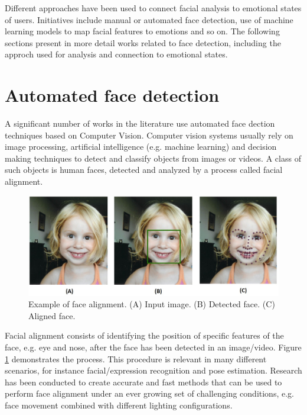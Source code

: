 Different approaches have been used to connect facial analysis to emotional states of users. Initiatives include manual or automated face detection, use of machine learning models to map facial features to emotions and so on. The following sections present in more detail works related to face detection, including the approch used for analysis and connection to emotional states.

\section{Automated face detection}

A significant number of works in the literature use automated face dection techniques based on Computer Vision. Computer vision systems usually rely on image processing, artificial intelligence (e.g. machine learning) and decision making techniques to detect and classify objects from images or videos. A class of such objects is human faces, detected and analyzed by a process called facial alignment.

\begin{figure}[h]
    \centering
    \includegraphics[width=\linewidth]{figures/face_alignment.jpg}
    \caption{Example of face alignment. (A) Input image. (B) Detected face. (C) Aligned face.}
    \label{fig:alignment}
\end{figure}

Facial alignment consists of identifying the position of specific features of the face, e.g. eye and nose, after the face has been detected in an image/video. Figure \ref{fig:alignment} demonstrates the process. This procedure is relevant in many different scenarios, for instance facial/expression recognition and pose estimation. Research has been conducted to create accurate and fast methods that can be used to perform face alignment under an ever growing set of challenging conditions, e.g. face movement combined with different lighting configurations.

